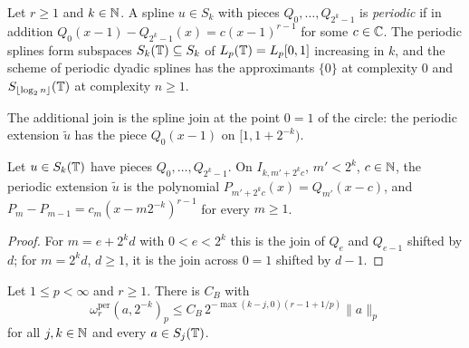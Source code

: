 \begin{definition}
\label{def:per-spline-space}
\leanok
{}
Let $r \geq 1$ and $k \in \mathbb{N}$. A spline $u \in S_k$ with pieces $Q_0, \dots, Q_{2^k - 1}$ is
\emph{periodic} if in addition $Q_0(x - 1) - Q_{2^k - 1}(x) = c (x - 1)^{r-1}$ for some
$c \in \mathbb{C}$. The periodic splines form subspaces $S_k(\mathbb{T}) \subseteq S_k$ of $L_p(\mathbb{T}) = L_p[0,1]$
increasing in $k$, and the scheme of periodic dyadic splines has the approximants $\{0\}$ at
complexity $0$ and $S_{\lfloor \log_2 n \rfloor}(\mathbb{T})$ at complexity $n \geq 1$.
\end{definition}

The additional join is the spline join at the point $0 = 1$ of the circle: the periodic extension
$\tilde u$ has the piece $Q_0(x - 1)$ on $[1, 1 + 2^{-k})$.

\begin{lemma}
\label{lem:per-spline-ext}
\leanok
{}
Let $u \in S_k(\mathbb{T})$ have pieces $Q_0, \dots, Q_{2^k - 1}$. On $I_{k, m' + 2^k c}$, $m' < 2^k$,
$c \in \mathbb{N}$, the periodic extension $\tilde u$ is the polynomial $P_{m' + 2^k c}(x) = Q_{m'}(x - c)$,
and $P_m - P_{m-1} = c_m (x - m 2^{-k})^{r-1}$ for every $m \geq 1$.
\end{lemma}

\begin{proof}
\leanok
For $m = e + 2^k d$ with $0 < e < 2^k$ this is the join of $Q_e$ and $Q_{e-1}$ shifted by $d$;
for $m = 2^k d$, $d \geq 1$, it is the join across $0 = 1$ shifted by $d - 1$.
\end{proof}

\begin{theorem}
\label{thm:per-spline-inverse}
\leanok
{}
Let $1 \leq p < \infty$ and $r \geq 1$. There is $C_B$ with
\[
  \omega_r^{\mathrm{per}}(a, 2^{-k})_p \leq C_B \, 2^{-\max(k - j, 0)(r - 1 + 1/p)} \|a\|_p
\]
for all $j, k \in \mathbb{N}$ and every $a \in S_j(\mathbb{T})$.
\end{theorem}

